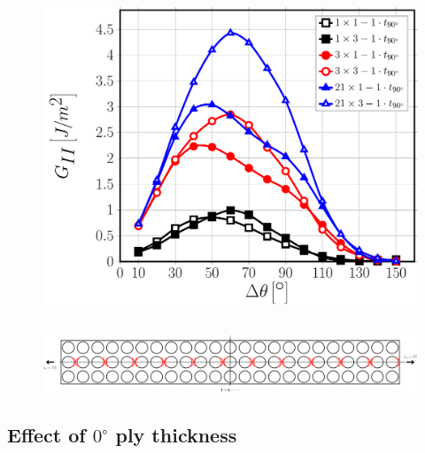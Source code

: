 \documentclass[first,firstsupp,lastsupp,last,hyperref,table]{ETHclass}
\begin{document}
\begin{frame}
\begin{columns}[c]
\begin{column}{0.5\textwidth}
\begin{figure}
\includegraphics[width=\columnwidth]{nxk-1-vf60-GII-crackshield1.pdf}
\end{figure}
\end{column}
\end{columns}
\begin{figure}
\centering
\includegraphics[width=\textwidth]{twofibers-sameside-crackshielding1.pdf}
\end{figure}
\end{frame}

\subsection{Effect of $0^{\circ}$ ply thickness}
\end{document}
